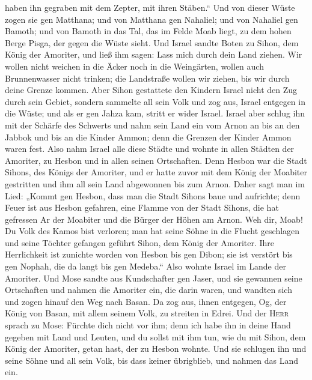 haben ihn gegraben mit dem Zepter, mit ihren Stäben.`` Und von dieser
Wüste zogen sie gen Matthana;  und von Matthana gen
Nahaliel; und von Nahaliel gen Bamoth;  und von Bamoth in
das Tal, das im Felde Moab liegt, zu dem hohen Berge Pisga, der gegen
die Wüste sieht.  Und Israel sandte Boten zu Sihon, dem
König der Amoriter, und ließ ihm sagen:  Lass mich durch
dein Land ziehen. Wir wollen nicht weichen in die Äcker noch in die
Weingärten, wollen auch Brunnenwasser nicht trinken; die Landstraße
wollen wir ziehen, bis wir durch deine Grenze kommen. 
Aber Sihon gestattete den Kindern Israel nicht den Zug durch sein
Gebiet, sondern sammelte all sein Volk und zog aus, Israel entgegen in
die Wüste; und als er gen Jahza kam, stritt er wider Israel.
 Israel aber schlug ihn mit der Schärfe des Schwerts und
nahm sein Land ein vom Arnon an bis an den Jabbok und bis an die Kinder
Ammon; denn die Grenzen der Kinder Ammon waren fest. 
Also nahm Israel alle diese Städte und wohnte in allen Städten der
Amoriter, zu Hesbon und in allen seinen Ortschaften. 
Denn Hesbon war die Stadt Sihons, des Königs der Amoriter, und er hatte
zuvor mit dem König der Moabiter gestritten und ihm all sein Land
abgewonnen bis zum Arnon.  Daher sagt man im Lied: „Kommt
gen Hesbon, dass man die Stadt Sihons baue und aufrichte;
 denn Feuer ist aus Hesbon gefahren, eine Flamme von der
Stadt Sihons, die hat gefressen Ar der Moabiter und die Bürger der Höhen
am Arnon.  Weh dir, Moab! Du Volk des Kamos bist
verloren; man hat seine Söhne in die Flucht geschlagen und seine Töchter
gefangen geführt Sihon, dem König der Amoriter.  Ihre
Herrlichkeit ist zunichte worden von Hesbon bis gen Dibon; sie ist
verstört bis gen Nophah, die da langt bis gen Medeba.`` 
Also wohnte Israel im Lande der Amoriter.  Und Mose
sandte aus Kundschafter gen Jaser, und sie gewannen seine Ortschaften
und nahmen die Amoriter ein, die darin waren,  und
wandten sich und zogen hinauf den Weg nach Basan. Da zog aus, ihnen
entgegen, Og, der König von Basan, mit allem seinem Volk, zu streiten in
Edrei.  Und der \textsc{Herr} sprach zu Mose: Fürchte
dich nicht vor ihm; denn ich habe ihn in deine Hand gegeben mit Land und
Leuten, und du sollst mit ihm tun, wie du mit Sihon, dem König der
Amoriter, getan hast, der zu Hesbon wohnte.  Und sie
schlugen ihn und seine Söhne und all sein Volk, bis dass keiner
übrigblieb, und nahmen das Land ein.

